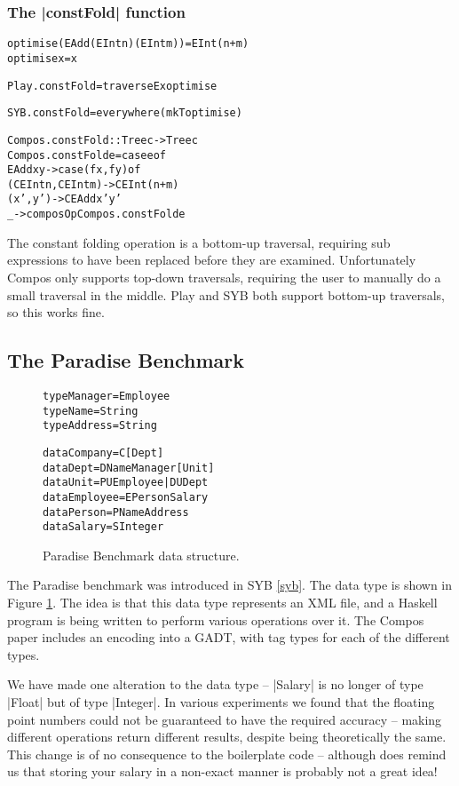 \documentclass[preprint]{sigplanconf}
\newenvironment{code}{\begin{alltt}\small}{\end{alltt}}
\begin{document}
\subsubsection{The |constFold| function}

\begin{code}
optimise (EAdd (EInt n) (EInt m)) = EInt (n+m)
optimise x = x

Play.constFold = traverseEx optimise

SYB.constFold = everywhere (mkT optimise)

Compos.constFold :: Tree c -> Tree c
Compos.constFold e = case e of
    EAdd x y -> case  (f x, f y) of
                      (CEInt n, CEInt m) -> CEInt (n+m)
                      (x',y') -> CEAdd x' y'
    _ -> composOp Compos.constFold e
\end{code}

The constant folding operation is a bottom-up traversal, requiring sub expressions to have been replaced before they are examined. Unfortunately Compos only supports top-down traversals, requiring the user to manually do a small traversal in the middle. Play and SYB both support bottom-up traversals, so this works fine.


\subsection{The Paradise Benchmark}

\begin{figure}
\begin{code}
type Manager = Employee
type Name = String
type Address = String

data Company = C [Dept]
data Dept = D Name Manager [Unit]
data Unit = PU Employee | DU Dept
data Employee = E Person Salary
data Person = P Name Address
data Salary = S Integer
\end{code}
\caption{Paradise Benchmark data structure.}
\label{fig:paradise}
\end{figure}

The Paradise benchmark was introduced in SYB \ref{syb}. The data type is shown in Figure \ref{fig:paradise}. The idea is that this data type represents an XML file, and a Haskell program is being written to perform various operations over it. The Compos paper includes an encoding into a GADT, with tag types for each of the different types.

We have made one alteration to the data type -- |Salary| is no longer of type |Float| but of type |Integer|. In various experiments we found that the floating point numbers could not be guaranteed to have the required accuracy -- making different operations return different results, despite being theoretically the same. This change is of no consequence to the boilerplate code -- although does remind us that storing your salary in a non-exact manner is probably not a great idea!
\end{document}
